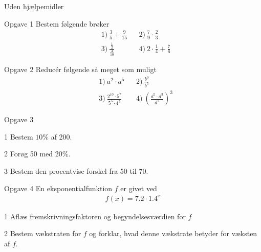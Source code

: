 \begin{center}
	\LARGE
	Uden hjælpemidler
\end{center}
\begin{opgavetekst}{Opgave 1}
	Bestem følgende brøker
	\begin{align*}
		&1) \   \frac{3}{5} + \frac{9}{15}   &&2) \  \frac{7}{9}\cdot\frac{2}{3}     \\
		&3) \  \frac{\frac{1}{2}}{\frac{4}{10}}    &&4) \  2\cdot \frac{1}{4} + \frac{7}{6}    
	\end{align*}
\end{opgavetekst}

\begin{opgavetekst}{Opgave 2}
	Reducér følgende så meget som muligt
	\begin{align*}
		&1) \   a^2\cdot a^5    &&2) \ \frac{b^9}{b^5}     \\
		&3) \   \frac{2^{10}\cdot 5^7}{5^5\cdot 4^5}    &&4) \  \left(\frac{d^7\cdot d^3}{d^2}\right)^3    
	\end{align*}
\end{opgavetekst}

\begin{opgavetekst}{Opgave 3}
\end{opgavetekst}

\begin{delopgave}{}{1}
	Bestem $10\%$ af 200.
\end{delopgave}
\begin{delopgave}{}{2}
	Forøg 50 med $20\%$.
\end{delopgave}
\begin{delopgave}{}{3}
	Bestem den procentvise forskel fra 50 til 70.
\end{delopgave}


\begin{opgavetekst}{Opgave 4}
	En eksponentialfunktion $f$ er givet ved
	\begin{align*}
		f(x) = 7.2\cdot 1.4^x
	\end{align*}
\end{opgavetekst}
\begin{delopgave}{}{1}
	Aflæs fremskrivningsfaktoren og begyndelsesværdien for $f$
\end{delopgave}
\begin{delopgave}{}{2}
	Bestem vækstraten for $f$ og forklar, hvad denne vækstrate betyder for væksten af $f$. 
\end{delopgave}

